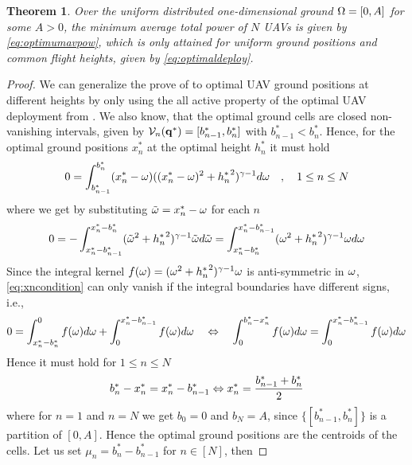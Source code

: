 \documentclass[smallabstract,smallcaptions]{dccpaper}
\newtheorem{theorem}{Theorem}
\newcommand{\Vor}{\ensuremath{\mathcal{V}}}         %
\begin{document}
\begin{theorem}\label{theorem:commonHeight}
  Over the uniform distributed one-dimensional ground $\Omega=[0,A]$ for some $A>0$,
  the minimum average total power of $N$ UAVs is given by \eqref{eq:optimumavpow},
  which is only attained for uniform ground positions and common flight heights, given by  \eqref{eq:optimaldeploy}.
\end{theorem}
%
\begin{proof}
  We can generalize the prove of  to optimal UAV ground positions at different heights by only
  using the all active property of the optimal UAV deployment from  . We also know, that the
  optimal ground cells are closed non-vanishing intervals, given by $\Vor_n(\vq^*)=[b_{n-1}^*,b_n^*]$ with
  $b^*_{n-1}<b_n^*$.  Hence, for the optimal ground positions $x_n^*$ at the optimal height $h_n^*$ it must hold 
  \begin{align}
    0 = \int^{b^*_n}_{b_{n-1}^*} (x_n^*-\omega) ((x_n^*-\omega)^2+{h^{*}_n}^2)^{\gamma-1}d\omega \quad,\quad 1\leq n\leq
    N\label{eq:vornx_diffh}
  \end{align}
  where we get by substituting ${  \tilde{\omega} }=x_n^*-\omega$ for each $n$ 
  \begin{align}
    0=-\int_{x_n^*-b^*_{n-1}}^{x^*_n-b^*_{n}} ({  \tilde{\omega} }^2+{h^{*}_n}^2)^{\gamma-1}{  \tilde{\omega} } d{  \tilde{\omega} } 
    =\int_{x_n^*-b^*_{n}}^{x_n^*-b^*_{n-1}} (\omega^2+{h^{*}_n}^2)^{\gamma-1}\omega d\omega\label{eq:xncondition}
  \end{align}
  Since the integral kernel $f(\omega)=(\omega^2+{h^{*}_n}^2)^{\gamma-1}\omega$ is  anti-symmetric in $\omega$,
  \eqref{eq:xncondition} can only vanish if the integral boundaries have different signs, i.e.,
  \begin{align}
    0= \int_{x_n^*-b_{n}^*}^0 f(\omega)d\omega + \int_0^{x_n^*-b_{n-1}^*} f(\omega)d\omega 
    \quad    \Leftrightarrow \quad
        \int_0^{b^*_n-x_n^*} f(\omega)d\omega = \int_0^{x_n^*-b^*_{n-1}}f(\omega)d\omega 
        \notag
  \end{align}
  Hence it must hold  for $1\leq n\leq N$
  \begin{align}
    b^*_{n} -{x^{*}_n}={x^{*}_n}-b^*_{n-1} \Leftrightarrow  {\ensuremath{x^{*}}_n}=\frac{b_{n-1}^*+b_{n}^*}{2}\label{eq:bnoptimal}
  \end{align}
  where for $n=1$ and $n=N$ we get $b_0=0$ and $b_N=A$, since $\{[b^*_{n-1},b_n^*]\}$ is a partition of $[0,A]$. Hence
  the optimal ground positions are the centroids of the cells.  Let us set $\mu_n=b_n^*-b_{n-1}^*$ for $n\in[N]$, then

\end{proof}
\end{document}
